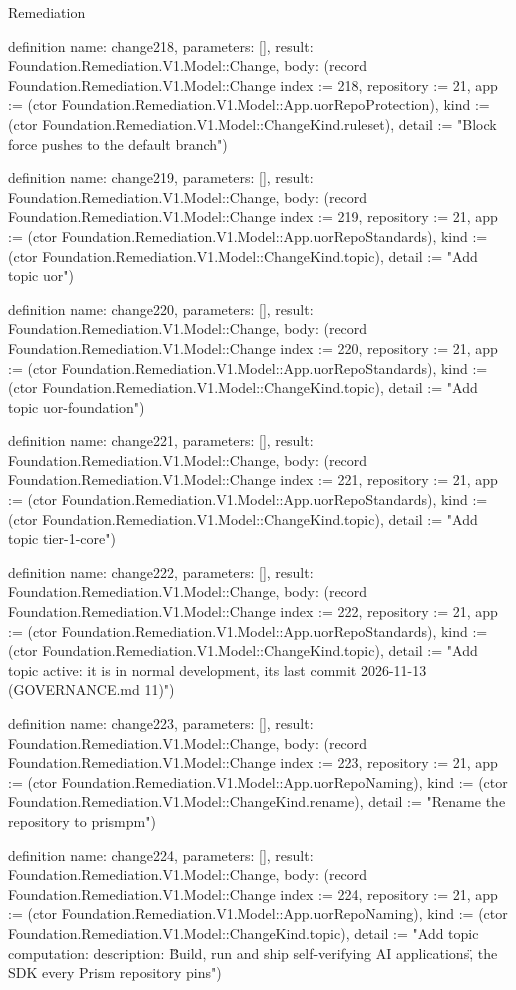 \begin{lexlean}{Remediation}
\begin{semanticmodule}
definition{
  name: change218,
  parameters: [],
  result: Foundation.Remediation.V1.Model::Change,
  body: (record Foundation.Remediation.V1.Model::Change {index := 218, repository := 21, app := (ctor Foundation.Remediation.V1.Model::App.uorRepoProtection), kind := (ctor Foundation.Remediation.V1.Model::ChangeKind.ruleset), detail := "Block force pushes to the default branch"})
}

definition{
  name: change219,
  parameters: [],
  result: Foundation.Remediation.V1.Model::Change,
  body: (record Foundation.Remediation.V1.Model::Change {index := 219, repository := 21, app := (ctor Foundation.Remediation.V1.Model::App.uorRepoStandards), kind := (ctor Foundation.Remediation.V1.Model::ChangeKind.topic), detail := "Add topic uor"})
}

definition{
  name: change220,
  parameters: [],
  result: Foundation.Remediation.V1.Model::Change,
  body: (record Foundation.Remediation.V1.Model::Change {index := 220, repository := 21, app := (ctor Foundation.Remediation.V1.Model::App.uorRepoStandards), kind := (ctor Foundation.Remediation.V1.Model::ChangeKind.topic), detail := "Add topic uor-foundation"})
}

definition{
  name: change221,
  parameters: [],
  result: Foundation.Remediation.V1.Model::Change,
  body: (record Foundation.Remediation.V1.Model::Change {index := 221, repository := 21, app := (ctor Foundation.Remediation.V1.Model::App.uorRepoStandards), kind := (ctor Foundation.Remediation.V1.Model::ChangeKind.topic), detail := "Add topic tier-1-core"})
}

definition{
  name: change222,
  parameters: [],
  result: Foundation.Remediation.V1.Model::Change,
  body: (record Foundation.Remediation.V1.Model::Change {index := 222, repository := 21, app := (ctor Foundation.Remediation.V1.Model::App.uorRepoStandards), kind := (ctor Foundation.Remediation.V1.Model::ChangeKind.topic), detail := "Add topic active: it is in normal development, its last commit 2026-11-13 (GOVERNANCE.md 11)"})
}

definition{
  name: change223,
  parameters: [],
  result: Foundation.Remediation.V1.Model::Change,
  body: (record Foundation.Remediation.V1.Model::Change {index := 223, repository := 21, app := (ctor Foundation.Remediation.V1.Model::App.uorRepoNaming), kind := (ctor Foundation.Remediation.V1.Model::ChangeKind.rename), detail := "Rename the repository to prismpm"})
}

definition{
  name: change224,
  parameters: [],
  result: Foundation.Remediation.V1.Model::Change,
  body: (record Foundation.Remediation.V1.Model::Change {index := 224, repository := 21, app := (ctor Foundation.Remediation.V1.Model::App.uorRepoNaming), kind := (ctor Foundation.Remediation.V1.Model::ChangeKind.topic), detail := "Add topic computation: description: \"Build, run and ship self-verifying AI applications\", the SDK every Prism repository pins"})
}


\end{semanticmodule}
\end{lexlean}
